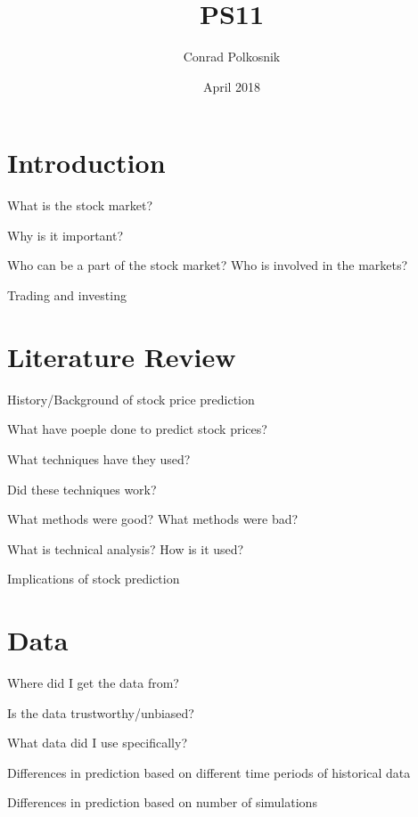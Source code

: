 \documentclass{article}
\title{PS11}
\author{Conrad Polkosnik }
\date{April 2018}
\begin{document}
\maketitle

\section{Introduction}

\begin{description}
\item What is the stock market?
\item Why is it important?
\item Who can be a part of the stock market? Who is involved in the markets?
\item Trading and investing
\end{description}

\section{Literature Review}

\begin{description}
\item History/Background of stock price prediction
\item What have poeple done to predict stock prices?
\item What techniques have they used?
\item Did these techniques work?
\item What methods were good? What methods were bad?
\item What is technical analysis? How is it used?
\item Implications of stock prediction
\end{description}

\section{Data}

\begin{description}
\item Where did I get the data from?
\item Is the data trustworthy/unbiased?
\item What data did I use specifically?
\item Differences in prediction based on different time periods of historical data
\item Differences in prediction based on number of simulations
\end{description}
\end{document}
